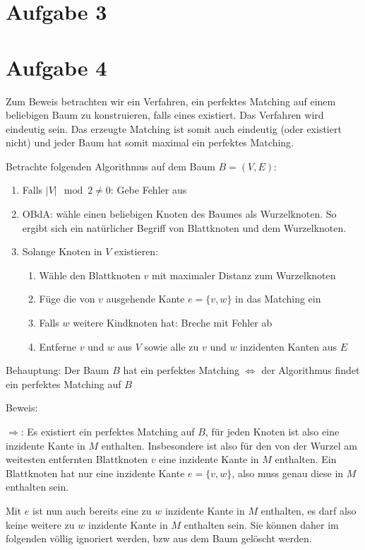 \documentclass[a4paper]{article}
\begin{document}
\section{Aufgabe 3}

\section{Aufgabe 4}

Zum Beweis betrachten wir ein Verfahren, ein perfektes Matching auf einem
beliebigen Baum zu konstruieren, falls eines existiert. Das Verfahren wird
eindeutig sein. Das erzeugte Matching ist somit auch eindeutig (oder 
existiert nicht) und jeder Baum hat somit maximal ein perfektes Matching.

Betrachte folgenden Algorithmus auf dem Baum $B = (V, E)$:
\begin{enumerate}
\item Falls $|V| \mod 2 \neq 0$: Gebe Fehler aus
\item OBdA: wähle einen beliebigen Knoten des Baumes als Wurzelknoten. So
ergibt sich ein natürlicher Begriff von Blattknoten und dem Wurzelknoten.
\item Solange Knoten in $V$ existieren:
	\begin{enumerate}
	\item Wähle den Blattknoten $v$ mit maximaler Distanz zum Wurzelknoten
	\item Füge die von $v$ ausgehende Kante $e = \{v, w\}$ in das Matching ein
	\item Falls $w$ weitere Kindknoten hat: Breche mit Fehler ab
	\item Entferne $v$ und $w$ aus $V$ sowie alle zu $v$ und $w$ inzidenten
	Kanten aus $E$
	\end{enumerate}
\end{enumerate}

Behauptung: Der Baum $B$ hat ein perfektes Matching $\Leftrightarrow$ der
Algorithmus findet ein perfektes Matching auf $B$

Beweis:

$\Rightarrow$: Es existiert ein perfektes Matching auf $B$, für jeden Knoten
ist also eine inzidente Kante in $M$ enthalten. Insbesondere ist also für
den von der Wurzel am weitesten entfernten Blattknoten $v$ eine inzidente Kante
in $M$ enthalten. Ein Blattknoten hat nur eine inzidente Kante $e = \{v, w\}$, also muss
genau diese in $M$ enthalten sein.

Mit $e$ ist nun auch bereits eine zu $w$ inzidente Kante in $M$ enthalten,
es darf also keine weitere zu $w$ inzidente Kante in $M$ enthalten sein.
Sie können daher im folgenden völlig ignoriert werden, bzw aus dem Baum
gelöscht werden.
\end{document}
